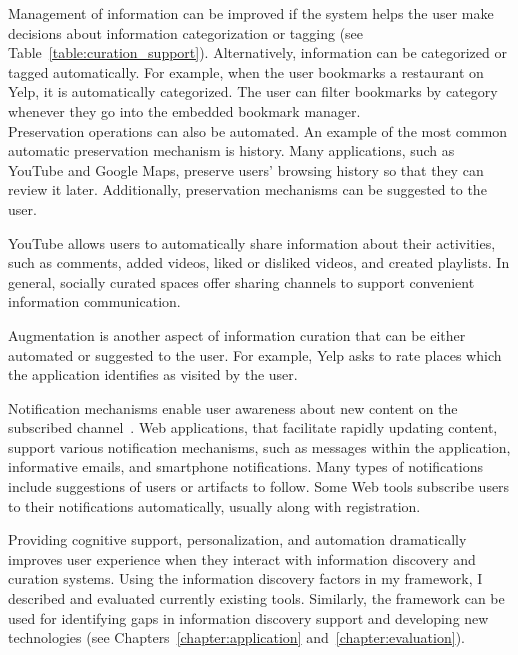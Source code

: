 {Management of information can be improved if the system helps the user make decisions about information categorization or tagging (see Table~\ref{table:curation_support}). Alternatively, information can be categorized or tagged automatically. For example, when the user bookmarks a restaurant on Yelp, it is automatically categorized. The user can filter bookmarks by category whenever they go into the embedded bookmark manager. \\

Preservation operations can also be automated. An example of the most common automatic preservation mechanism is history. Many applications, such as YouTube and Google Maps, preserve users' browsing history so that they can review it later. Additionally, preservation mechanisms can be suggested to the user.

YouTube allows users to automatically share information about their activities, such as comments,  added videos, liked or disliked videos, and created playlists. In general, socially curated spaces offer sharing channels to support convenient information communication.
 
Augmentation is another aspect of information curation that can be either automated or suggested to the user. For example, Yelp asks to rate places which the application identifies as visited by the user. 

Notification mechanisms enable user awareness about new content on the subscribed channel~\cite{millen2005social}. Web applications, that facilitate rapidly updating content, support various notification mechanisms, such as messages within the application, informative emails, and smartphone notifications. Many types of notifications include suggestions of users or artifacts to follow. Some Web tools subscribe users to their notifications automatically, usually along with registration.\\
} %

Providing cognitive support, personalization, and automation dramatically improves user experience when they interact with information discovery and curation systems. Using the information discovery factors in my framework, I described and evaluated currently existing tools. Similarly, the framework can be used for identifying gaps in information discovery support and developing new technologies (see Chapters~\ref{chapter:application} and~\ref{chapter:evaluation}).  